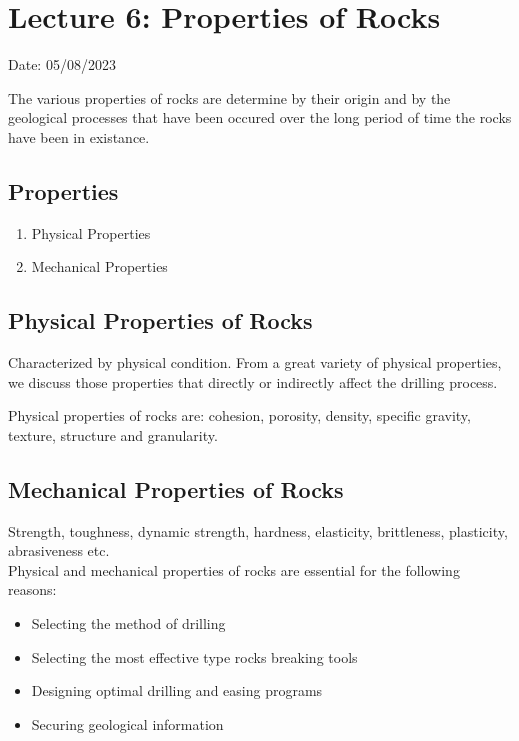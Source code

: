 \documentclass{article}
\begin{document}
  \section{Lecture 6: Properties of Rocks}
\hfill Date: 05/08/2023

\begin{multicols}{2}
  
  
  The various properties of rocks are determine by their origin and by the geological processes that have been occured over the long period of time the rocks have been in existance.
  
  \subsection*{Properties}
  \begin{enumerate}
    \item Physical Properties 
    \item Mechanical Properties
  \end{enumerate}
  
  \subsection*{Physical Properties of Rocks}
  Characterized by physical condition. From a great variety of physical properties, we discuss those properties that directly or indirectly affect the drilling process.
  
  Physical properties of rocks are: cohesion, porosity, density, specific gravity, texture, structure and granularity. 

  \subsection*{Mechanical Properties of Rocks}
  Strength, toughness, dynamic strength, hardness, elasticity, brittleness, plasticity, abrasiveness etc. \\

  Physical and mechanical properties of rocks are essential for the following reasons:
  \begin{itemize}
    \item Selecting the method of drilling 
    \item Selecting the most effective type rocks breaking tools
    \item Designing optimal drilling and easing programs
    \item Securing geological information
  \end{itemize}


\end{multicols}
\end{document}
